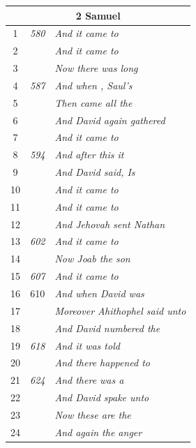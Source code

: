 \documentclass{article}
\newlength{\minipageheight}
\newlength{\minipagewidth}
\begin{document}
\begin{minipage}[r][\minipageheight][t]{\minipagewidth}
\begin{longtable}{ccl}
        \multicolumn{3}{c}{\textbf{2 Samuel}}                               \\
        \hline
        1           & \textit{580} & \textit{And it came to}                \\
        2           &              & \textit{And it came to}                \\
        3           &              & \textit{Now there was long}            \\
        4           & \textit{587} & \textit{And when , Saul’s}             \\
        5           &              & \textit{Then came all the}             \\
        6           &              & \textit{And David again gathered}      \\
        7           &              & \textit{And it came to}                \\
        8           & \textit{594} & \textit{And after this it}             \\
        9           &              & \textit{And David said, Is}            \\
        10          &              & \textit{And it came to}                \\
        11          &              & \textit{And it came to}                \\
        12          &              & \textit{And Jehovah sent Nathan}       \\
        13          & \textit{602} & \textit{And it came to}                \\
        14          &              & \textit{Now Joab the son}              \\
        15          & \textit{607} & \textit{And it came to}                \\
        16          & 610          & \textit{And when David was}            \\
        17          &              & \textit{Moreover Ahithophel said unto} \\
        18          &              & \textit{And David numbered the}        \\
        19          & \textit{618} & \textit{And it was told}               \\
        20          &              & \textit{And there happened to}         \\
        21          & \textit{624} & \textit{And there was a}               \\
        22          &              & \textit{And David spake unto}          \\
        23          &              & \textit{Now these are the}             \\
        24          &              & \textit{And again the anger}           \\


\end{longtable}
\end{minipage}
\end{document}
